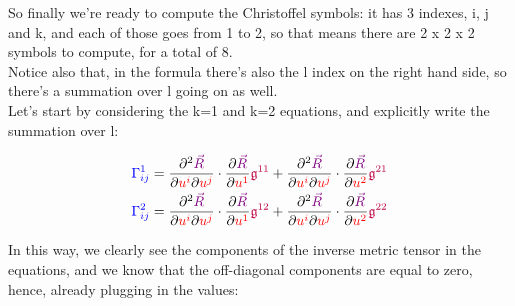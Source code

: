 So finally we're ready to compute the Christoffel symbols: it has 3 indexes, i, j and k, and each of those 
goes from 1 to 2, so that means there are 2 x 2 x 2 symbols to compute, for a total of 8.\\
Notice also that, in the formula there's also the l index on the right hand side, so there's a summation over l going on as well.\\

Let's start by considering the k=1 and k=2 equations, and explicitly write the summation over l:

\begin{align*}
    \begingroup\color{blue}\Gamma^{1}_{ij}\endgroup &= \frac{\partial^2 \begingroup\color{violet}\vec{R}\endgroup}{\partial \begingroup\color{red}u^i\endgroup \partial\begingroup\color{red}u^j\endgroup} \cdot \frac{\partial \begingroup\color{violet}\vec{R}\endgroup}{\partial \begingroup\color{red}u^1\endgroup} \begingroup\color{purple}\mathfrak{g}^{11}\endgroup
    + \frac{\partial^2 \begingroup\color{violet}\vec{R}\endgroup}{\partial \begingroup\color{red}u^i\endgroup \partial\begingroup\color{red}u^j\endgroup} \cdot \frac{\partial \begingroup\color{violet}\vec{R}\endgroup}{\partial \begingroup\color{red}u^2\endgroup} \begingroup\color{purple}\mathfrak{g}^{21}\endgroup\\
    \begingroup\color{blue}\Gamma^{2}_{ij}\endgroup &= \frac{\partial^2 \begingroup\color{violet}\vec{R}\endgroup}{\partial \begingroup\color{red}u^i\endgroup \partial\begingroup\color{red}u^j\endgroup} \cdot \frac{\partial \begingroup\color{violet}\vec{R}\endgroup}{\partial \begingroup\color{red}u^1\endgroup} \begingroup\color{purple}\mathfrak{g}^{12}\endgroup
    + \frac{\partial^2 \begingroup\color{violet}\vec{R}\endgroup}{\partial \begingroup\color{red}u^i\endgroup \partial\begingroup\color{red}u^j\endgroup} \cdot \frac{\partial \begingroup\color{violet}\vec{R}\endgroup}{\partial \begingroup\color{red}u^2\endgroup} \begingroup\color{purple}\mathfrak{g}^{22}\endgroup
\end{align*}

In this way, we clearly see the components of the inverse metric tensor in the equations, and we know that the off-diagonal components are equal to zero, hence, already plugging in the values:

